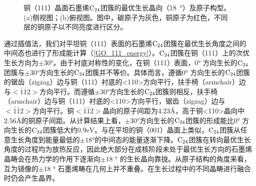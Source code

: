         \begin{figure}[htbp]
            \caption{铜（111）晶面石墨烯$\rm{C_{24}}$团簇的最优生长晶向（\SI{18}  {\degree}）及原子构型。(a)侧视图；(b)俯视图。图中，碳原子为灰色，铜原子为红色，不同层的铜原子以不同亮度进行区分。
            }    
            \label{GO_111_structure}
            
        \end{figure}

        通过插值法，我们对平坦铜（111）表面的石墨烯$\rm{C_{24}}$团簇在最优生长角度之间的中间态也进行了形成能计算（\ref{GO_111_energy}）。$\rm{C_{24}}$团簇在铜（111）上的次优生长方向为$\pm 30$\si{\degree}。由于衬底对称性的变化，在铜（111）表面，$0\si{\degree}$ 方向生长的$\rm{C_{24}}$团簇与$\pm 30\si{\degree}$方向生长的$\rm{C_{24}}$团簇并不等价。具体而言，遵循$0\si{\degree}$ 方向生长的$\rm{C_{24}}$团簇的锯齿（zigzag）边与铜（111）衬底的<110>方向平行，扶手椅（armchair）边与$<\bar{1}\bar{1}2>$方向平行。而遵循$\pm 30\si{\degree}$方向生长的$\rm{C_{24}}$团簇则相反，扶手椅（armchair）边与铜（111）衬底的<110>方向平行，锯齿（zigzag）边与$<\bar{1}\bar{1}2>$方向平行。铜$<\bar{1}\bar{1}2>$晶向的原子间距为$4.23 \si{\angstrom}$，高于铜<110>晶向中$2.56 \si{\angstrom}$的铜原子间距。从计算结果上看，$\pm 30\si{\degree}$方向生长的$\rm{C_{24}}$团簇的形成能比$0\si{\degree}$ 方向生长的$\rm{C_{24}}$团簇低大约$0.9\si{\electronvolt}$。与在平坦的铜（001）晶面上类似，$\rm{C_{24}}$团簇从任意生长角度到能量最低的$\pm 18 \si{\degree}$的中间态的能量逐渐下降。$\rm{C_{24}}$团簇在转向最优生长角度的过程均为放热反应，因此绝大部分在成核阶段未处于最优生长方向的石墨烯晶畴会在热力学的作用下逐渐向$\pm 18$ \si{\degree} 的生长晶向靠拢。从原子结构的角度来看，互为镜像的$\pm 18$ \si{\degree} 石墨烯畴在几何上并不重叠。在生长过程中的不同晶畴进行融合时仍会产生晶界。

